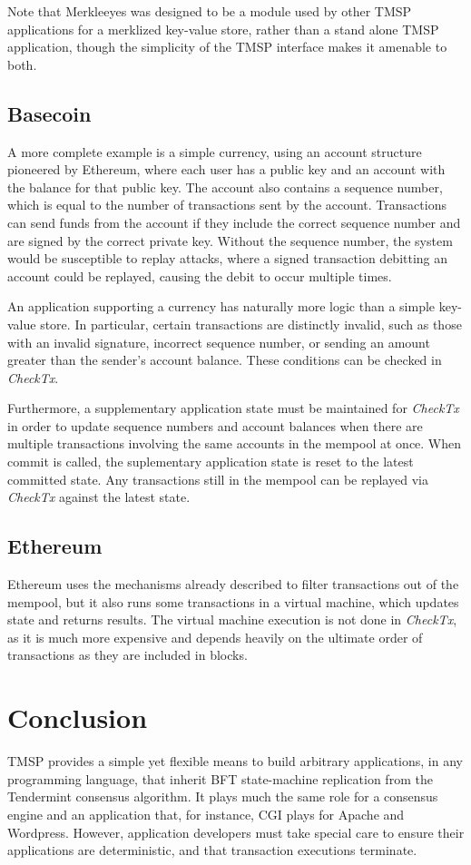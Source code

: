 Note that Merkleeyes was designed to be a module used by other TMSP applications for a merklized key-value store,
rather than a stand alone TMSP application, though the simplicity of the TMSP interface makes it amenable to both.

\subsection{Basecoin}

A more complete example is a simple currency, 
using an account structure pioneered by Ethereum, 
where each user has a public key and an account with the balance for that public key.
The account also contains a sequence number, which is equal to the number of transactions sent by the account.
Transactions can send funds from the account if they include the correct sequence number
and are signed by the correct private key.
Without the sequence number, the system would be susceptible to replay attacks,
where a signed transaction debitting an account could be replayed, 
causing the debit to occur multiple times.

An application supporting a currency has naturally more logic than a simple key-value store.
In particular, certain transactions are distinctly invalid, 
such as those with an invalid signature, incorrect sequence number,
or sending an amount greater than the sender's account balance.
These conditions can be checked in \emph{CheckTx}.

Furthermore, a supplementary application state must be maintained for \emph{CheckTx} 
in order to update sequence numbers and account balances 
when there are multiple transactions involving the same accounts in the mempool at once.
When commit is called, the suplementary application state is reset to the latest committed state.
Any transactions still in the mempool can be replayed via \emph{CheckTx} against the latest state.

\subsection{Ethereum}

Ethereum uses the mechanisms already described to filter transactions out of the mempool,
but it also runs some transactions in a virtual machine, 
which updates state and returns results.
The virtual machine execution is not done in \emph{CheckTx}, 
as it is much more expensive and depends heavily on the ultimate order of transactions as they are included in blocks.

\section{Conclusion}

TMSP provides a simple yet flexible means to build arbitrary applications,
in any programming language,
that inherit BFT state-machine replication from the Tendermint consensus algorithm.
It plays much the same role for a consensus engine and an application that, for instance, CGI plays for Apache and Wordpress.
However, application developers must take special care to ensure their applications are deterministic, and that transaction executions terminate.

